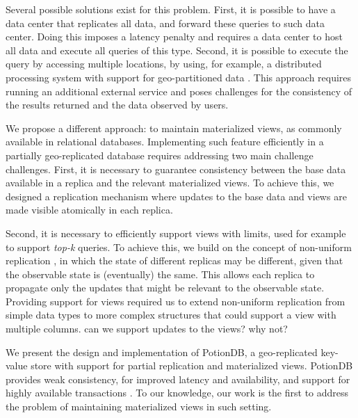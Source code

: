 \documentclass{vldb}
\newcommand{\grumbler}[2]{{\color{red}{\bf #1:} #2}}
\newcommand{\nuno}[1]{\grumbler{nuno}{#1}}
\begin{document}
Several possible solutions exist for this problem. 
First, it is possible to have a data center that replicates all data, and forward these queries to such data center.
Doing this imposes a latency penalty and requires a data center to host all data and execute all queries of this type. 
Second, it is possible to execute the query by accessing multiple locations, by using, for example, 
a distributed processing system with support for geo-partitioned data \cite{Kloudas:2015:POD:2850578.2850582,more}.
This approach requires running an additional external service and poses challenges for the consistency of the results
returned and the data observed by users.

We propose a different approach: to maintain materialized views, as commonly available in relational databases.
Implementing such feature efficiently in a partially geo-replicated database requires 
addressing two main challenge challenges. 
First, it is necessary to guarantee consistency between the base data available in a replica and the 
relevant materialized views. To achieve this, we designed a replication mechanism where updates 
to the base data and views are made visible atomically in each replica.

Second, it is necessary to efficiently support views with limits, used for example to support \emph{top-k} 
queries. To achieve this, we build on the concept of non-uniform replication \cite{Cabrita17Nonuniform}, in which the state
of different replicas may be different, given that the observable state is (eventually) the same.
This allows each replica to propagate only the updates that might be relevant to the observable 
state. Providing support for views required us to extend non-uniform replication from simple data 
types to more complex structures that could support a view with multiple columns.
\nuno{can we support updates to the views? why not?}

We present the design and implementation of PotionDB, a geo-replicated key-value store with support  
for partial replication and materialized views. 
PotionDB provides weak consistency, for improved latency and availability, and support for highly
available transactions \cite{hat}.  
To our knowledge, our work is the first to address the problem of maintaining materialized views
in such setting.  
\end{document}
